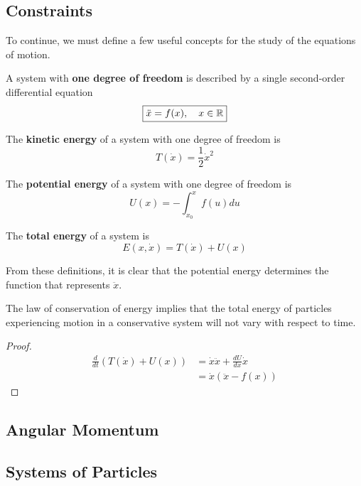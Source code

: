 \documentclass{article}
\begin{document}
		\subsection{Constraints}
		To continue, we must define a few useful concepts for the study of the equations of motion.
		\begin{defn}
			A system with \textbf{one degree of freedom} is described by a single second-order differential equation
			\begin{equation}
				\label{eq:OneDegree}
				\boxed{\ddot{x} = f(x), \quad x \in \mathbb{R}}
			\end{equation}
		\end{defn}
		\begin{defn}
			The \textbf{kinetic energy} of a system with one degree of freedom is
			\begin{equation}
				\label{eq:KineticOneDegree}
				\boxed{T\left(\dot{x}\right) = \frac12 \dot{x}^2}
			\end{equation}
		\end{defn}
		\begin{defn}
			The \textbf{potential energy} of a system with one degree of freedom is
			\begin{equation}
				\label{eq:PotentialOneDegree}
				\boxed{U(x) = -\int_{x_0}^x f(u)du}
			\end{equation}
		\end{defn}
		\begin{defn}
			The \textbf{total energy} of a system is 
			\begin{equation}
				\label{eq:TotalEnergy}
				\boxed{E \left(x, \dot{x}\right) = T\left(\dot{x}\right)+U(x)}
			\end{equation}
		\end{defn}
		From these definitions, it is clear that the potential energy determines the function that represents $\ddot{x}$.
		\begin{thm}
			The law of conservation of energy implies that the total energy of particles experiencing motion in a conservative system will not vary with respect to time. 
		\end{thm}
		\begin{proof}
			\begin{align*}
				\frac{d}{dt} \left( T\left(\dot{x} \right) + U(x)\right) &= \dot{x}\ddot{x} + \frac{dU}{dx} \dot{x}\\ 
				&= \dot{x} \left( \ddot{x} - f(x)\right)
			\end{align*}
		\end{proof}
		\subsection{Angular Momentum}
		\subsection{Systems of Particles}
\end{document}
